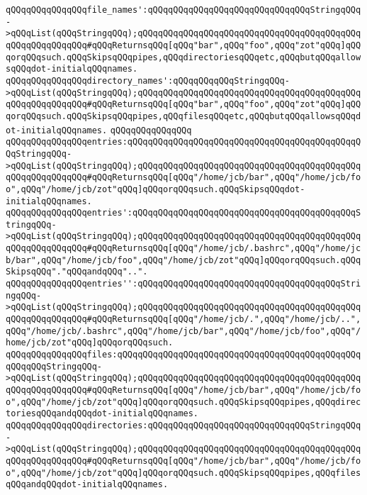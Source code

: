 \verb|qQQqqQQqqQQqqQQqfile_names':qQQqqQQqqQQqqQQqqQQqqQQqqQQqqQQqStringqQQq->qQQqList(qQQqStringqQQq);qQQqqQQqqQQqqQQqqQQqqQQqqQQqqQQqqQQqqQQqqQQqqQQqqQQqqQQqqQQq#qQQqReturnsqQQq[qQQq"bar",qQQq"foo",qQQq"zot"qQQq]qQQqorqQQqsuch.qQQqSkipsqQQqpipes,qQQqdirectoriesqQQqetc,qQQqbutqQQqallowsqQQqdot-initialqQQqnames.|\newline
\verb|qQQqqQQqqQQqqQQqdirectory_names':qQQqqQQqqQQqStringqQQq->qQQqList(qQQqStringqQQq);qQQqqQQqqQQqqQQqqQQqqQQqqQQqqQQqqQQqqQQqqQQqqQQqqQQqqQQqqQQq#qQQqReturnsqQQq[qQQq"bar",qQQq"foo",qQQq"zot"qQQq]qQQqorqQQqsuch.qQQqSkipsqQQqpipes,qQQqfilesqQQqetc,qQQqbutqQQqallowsqQQqdot-initialqQQqnames.|\newline
\verb|qQQqqQQqqQQqqQQq|\newline
\verb|qQQqqQQqqQQqqQQqentries:qQQqqQQqqQQqqQQqqQQqqQQqqQQqqQQqqQQqqQQqqQQqqQQqStringqQQq->qQQqList(qQQqStringqQQq);qQQqqQQqqQQqqQQqqQQqqQQqqQQqqQQqqQQqqQQqqQQqqQQqqQQqqQQqqQQq#qQQqReturnsqQQq[qQQq"/home/jcb/bar",qQQq"/home/jcb/foo",qQQq"/home/jcb/zot"qQQq]qQQqorqQQqsuch.qQQqSkipsqQQqdot-initialqQQqnames.|\newline
\verb|qQQqqQQqqQQqqQQqentries':qQQqqQQqqQQqqQQqqQQqqQQqqQQqqQQqqQQqqQQqqQQqStringqQQq->qQQqList(qQQqStringqQQq);qQQqqQQqqQQqqQQqqQQqqQQqqQQqqQQqqQQqqQQqqQQqqQQqqQQqqQQqqQQq#qQQqReturnsqQQq[qQQq"/home/jcb/.bashrc",qQQq"/home/jcb/bar",qQQq"/home/jcb/foo",qQQq"/home/jcb/zot"qQQq]qQQqorqQQqsuch.qQQqSkipsqQQq"."qQQqandqQQq"..".|\newline
\verb|qQQqqQQqqQQqqQQqentries'':qQQqqQQqqQQqqQQqqQQqqQQqqQQqqQQqqQQqqQQqStringqQQq->qQQqList(qQQqStringqQQq);qQQqqQQqqQQqqQQqqQQqqQQqqQQqqQQqqQQqqQQqqQQqqQQqqQQqqQQqqQQq#qQQqReturnsqQQq[qQQq"/home/jcb/.",qQQq"/home/jcb/..",qQQq"/home/jcb/.bashrc",qQQq"/home/jcb/bar",qQQq"/home/jcb/foo",qQQq"/home/jcb/zot"qQQq]qQQqorqQQqsuch.|\newline
\newline
\verb|qQQqqQQqqQQqqQQqfiles:qQQqqQQqqQQqqQQqqQQqqQQqqQQqqQQqqQQqqQQqqQQqqQQqqQQqqQQqStringqQQq->qQQqList(qQQqStringqQQq);qQQqqQQqqQQqqQQqqQQqqQQqqQQqqQQqqQQqqQQqqQQqqQQqqQQqqQQqqQQq#qQQqReturnsqQQq[qQQq"/home/jcb/bar",qQQq"/home/jcb/foo",qQQq"/home/jcb/zot"qQQq]qQQqorqQQqsuch.qQQqSkipsqQQqpipes,qQQqdirectoriesqQQqandqQQqdot-initialqQQqnames.|\newline
\verb|qQQqqQQqqQQqqQQqdirectories:qQQqqQQqqQQqqQQqqQQqqQQqqQQqqQQqStringqQQq->qQQqList(qQQqStringqQQq);qQQqqQQqqQQqqQQqqQQqqQQqqQQqqQQqqQQqqQQqqQQqqQQqqQQqqQQqqQQq#qQQqReturnsqQQq[qQQq"/home/jcb/bar",qQQq"/home/jcb/foo",qQQq"/home/jcb/zot"qQQq]qQQqorqQQqsuch.qQQqSkipsqQQqpipes,qQQqfilesqQQqandqQQqdot-initialqQQqnames.|\newline
